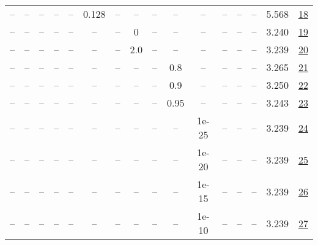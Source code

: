 \begin{table}[H]
\begin{tabular}{cccccccccccccccc}
-- & -- & -- & -- & -- & 0.128 & -- & -- & -- & -- & -- & -- & -- & -- & 5.568 & \href{https://wandb.ai/stanford-mercury/optimizer-scaling/runs/sweep-130m-21B-muona3b5c1lr0.128-wd0.1-minlr0-warmup0-b10.8-b20.-2bfad0}{18} \\
-- & -- & -- & -- & -- & -- & -- & 0 & -- & -- & -- & -- & -- & -- & 3.240 & \href{https://wandb.ai/stanford-mercury/optimizer-scaling/runs/sweep-130m-21B-muon3c0689lr0.008-wd0.1-minlr0-warmup0-b10.8-b20.-9eb7b5}{19} \\
-- & -- & -- & -- & -- & -- & -- & 2.0 & -- & -- & -- & -- & -- & -- & 3.239 & \href{https://wandb.ai/stanford-mercury/optimizer-scaling/runs/sweep-130m-21B-muonaf4344lr0.008-wd0.1-minlr0-warmup0-b10.8-b20.-66a04c}{20} \\
-- & -- & -- & -- & -- & -- & -- & -- & -- & 0.8 & -- & -- & -- & -- & 3.265 & \href{https://wandb.ai/stanford-mercury/optimizer-scaling/runs/sweep-130m-21B-muon118538lr0.008-wd0.1-minlr0-warmup0-b10.8-b20.-1a35c1}{21} \\
-- & -- & -- & -- & -- & -- & -- & -- & -- & 0.9 & -- & -- & -- & -- & 3.250 & \href{https://wandb.ai/stanford-mercury/optimizer-scaling/runs/sweep-130m-21B-muon5b982elr0.008-wd0.1-minlr0-warmup0-b10.8-b20.-f92115}{22} \\
-- & -- & -- & -- & -- & -- & -- & -- & -- & 0.95 & -- & -- & -- & -- & 3.243 & \href{https://wandb.ai/stanford-mercury/optimizer-scaling/runs/sweep-130m-21B-muonaaa155lr0.008-wd0.1-minlr0-warmup0-b10.8-b20.-1a184f}{23} \\
-- & -- & -- & -- & -- & -- & -- & -- & -- & -- & 1e-25 & -- & -- & -- & 3.239 & \href{https://wandb.ai/stanford-mercury/optimizer-scaling/runs/sweep-130m-21B-muonf5a17flr0.008-wd0.1-minlr0-warmup0-b10.8-b20.-d3ea9f}{24} \\
-- & -- & -- & -- & -- & -- & -- & -- & -- & -- & 1e-20 & -- & -- & -- & 3.239 & \href{https://wandb.ai/stanford-mercury/optimizer-scaling/runs/sweep-130m-21B-muonba539dlr0.008-wd0.1-minlr0-warmup0-b10.8-b20.-be254c}{25} \\
-- & -- & -- & -- & -- & -- & -- & -- & -- & -- & 1e-15 & -- & -- & -- & 3.239 & \href{https://wandb.ai/stanford-mercury/optimizer-scaling/runs/sweep-130m-21B-muon76efcelr0.008-wd0.1-minlr0-warmup0-b10.8-b20.-47ca65}{26} \\
-- & -- & -- & -- & -- & -- & -- & -- & -- & -- & 1e-10 & -- & -- & -- & 3.239 & \href{https://wandb.ai/stanford-mercury/optimizer-scaling/runs/sweep-130m-21B-muond1317flr0.008-wd0.1-minlr0-warmup0-b10.8-b20.-b6514e}{27} \\

\end{tabular}
\end{table}
